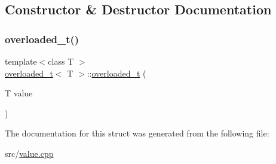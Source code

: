 \subsection{Constructor \& Destructor Documentation}
\mbox{\label{structoverloaded__t_3_01_t_01_4_a4261ae456540b95220a261d78315bcc9}} 
\subsubsection{\texorpdfstring{overloaded\+\_\+t()}{overloaded\_t()}}
{\footnotesize\ttfamily template$<$class T $>$ \\
\hyperlink{structoverloaded__t}{overloaded\+\_\+t}$<$ T $>$\+::\hyperlink{structoverloaded__t}{overloaded\+\_\+t} (\begin{DoxyParamCaption}\item[{T}]{value }\end{DoxyParamCaption})\hspace{0.3cm}{\ttfamily [inline]}}



The documentation for this struct was generated from the following file\+:\begin{DoxyCompactItemize}
\item 
src/\hyperlink{value_8cpp}{value.\+cpp}\end{DoxyCompactItemize}
